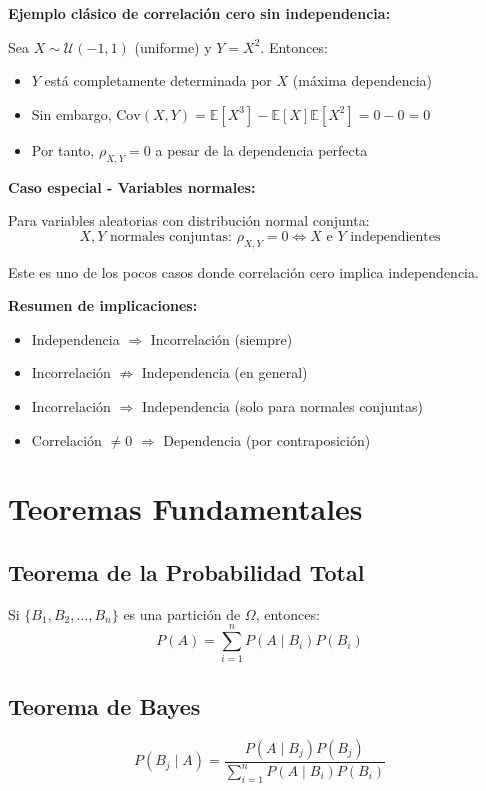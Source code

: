 \documentclass[12pt,a4paper]{article}
\begin{document}
\textbf{Ejemplo clásico de correlación cero sin independencia:}

Sea $X \sim \mathcal{U}(-1, 1)$ (uniforme) y $Y = X^2$. Entonces:
\begin{itemize}
    \item $Y$ está completamente determinada por $X$ (máxima dependencia)
    \item Sin embargo, $\mathrm{Cov}(X,Y) = \mathbb{E}[X^3] - \mathbb{E}[X]\mathbb{E}[X^2] = 0 - 0 = 0$
    \item Por tanto, $\rho_{X,Y} = 0$ a pesar de la dependencia perfecta
\end{itemize}

\textbf{Caso especial - Variables normales:}

Para variables aleatorias con distribución normal conjunta:
\begin{equation}
    X, Y \text{ normales conjuntas: } \rho_{X,Y} = 0 \Leftrightarrow X \text{ e } Y \text{ independientes}
\end{equation}

Este es uno de los pocos casos donde correlación cero implica independencia.

\textbf{Resumen de implicaciones:}
\begin{itemize}
    \item Independencia $\Rightarrow$ Incorrelación (siempre)
    \item Incorrelación $\not\Rightarrow$ Independencia (en general)
    \item Incorrelación $\Rightarrow$ Independencia (solo para normales conjuntas)
    \item Correlación $\neq 0$ $\Rightarrow$ Dependencia (por contraposición)
\end{itemize}

\section{Teoremas Fundamentales}
\subsection{Teorema de la Probabilidad Total}
Si $\{B_1, B_2, \dots, B_n\}$ es una partición de $\Omega$, entonces:
\begin{equation}
    P(A) = \sum_{i=1}^n P(A \mid B_i) P(B_i)
\end{equation}

\subsection{Teorema de Bayes}
\begin{equation}
    P(B_j \mid A) = \frac{P(A \mid B_j) P(B_j)}{\sum_{i=1}^n P(A \mid B_i) P(B_i)}
\end{equation}
\end{document}
